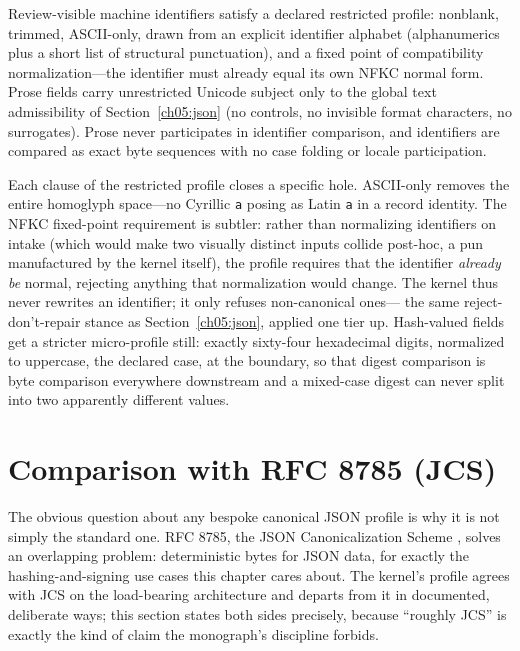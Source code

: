 \begin{ruleenv}\label{ch05:rule:tiers}
Review-visible machine identifiers satisfy a declared restricted profile:
nonblank, trimmed, ASCII-only, drawn from an explicit identifier alphabet
(alphanumerics plus a short list of structural punctuation), and a fixed
point of compatibility normalization---the identifier must already equal
its own NFKC normal form. Prose fields carry unrestricted Unicode subject
only to the global text admissibility of Section~\ref{ch05:json}
(no controls, no invisible format characters, no surrogates). Prose never
participates in identifier comparison, and identifiers are compared as
exact byte sequences with no case folding or locale participation.
\end{ruleenv}

Each clause of the restricted profile closes a specific hole. ASCII-only
removes the entire homoglyph space---no Cyrillic \texttt{a} posing as
Latin \texttt{a} in a record identity. The NFKC fixed-point requirement is
subtler: rather than normalizing identifiers on intake (which would make
two visually distinct inputs collide post-hoc, a pun manufactured by the
kernel itself), the profile requires that the identifier \emph{already be}
normal, rejecting anything that normalization would change. The kernel
thus never rewrites an identifier; it only refuses non-canonical ones---
the same reject-don't-repair stance as Section~\ref{ch05:json}, applied
one tier up. Hash-valued fields get a stricter micro-profile still: exactly
sixty-four hexadecimal digits, normalized to uppercase, the declared
case, at the boundary, so that digest comparison is byte comparison
everywhere downstream and a mixed-case digest can never split into two
apparently different values.

\section{Comparison with RFC 8785 (JCS)}\label{ch05:jcs}

The obvious question about any bespoke canonical JSON profile is why it is
not simply the standard one. RFC 8785, the JSON Canonicalization Scheme
\cite{jcs}, solves an overlapping problem: deterministic bytes for JSON
data, for exactly the hashing-and-signing use cases this chapter cares
about. The kernel's profile agrees with JCS on the load-bearing
architecture and departs from it in documented, deliberate ways; this
section states both sides precisely, because ``roughly JCS'' is exactly
the kind of claim the monograph's discipline forbids.

